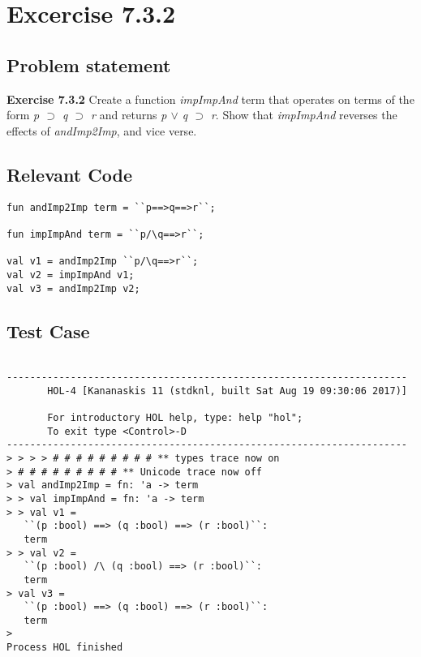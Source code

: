 \documentclass{report}
\begin{document}
\chapter{Excercise 7.3.2}
\label{cha:7.3.2}


\section{Problem statement}
\label{problem-statement-7-3-2}
\textbf{Exercise 7.3.2} Create a function \emph{impImpAnd} term that operates on terms of the form \emph{p $\supset$ q $\supset$ r} and returns \emph{p $\lor$ q $\supset$ r}. Show that \emph{impImpAnd} reverses the effects of \emph{andImp2Imp}, and vice verse.

\section{Relevant Code}
\label{rel-code-7-3-2}
\begin{lstlisting}[frame=TBlr]
fun andImp2Imp term = ``p==>q==>r``;

fun impImpAnd term = ``p/\q==>r``;

val v1 = andImp2Imp ``p/\q==>r``;
val v2 = impImpAnd v1;
val v3 = andImp2Imp v2;

\end{lstlisting}

\section{Test Case}
\label{test-results-7-3-2}
\begin{session}
  \begin{scriptsize}
\begin{verbatim}

---------------------------------------------------------------------
       HOL-4 [Kananaskis 11 (stdknl, built Sat Aug 19 09:30:06 2017)]

       For introductory HOL help, type: help "hol";
       To exit type <Control>-D
---------------------------------------------------------------------
> > > > # # # # # # # # # ** types trace now on
> # # # # # # # # # ** Unicode trace now off
> val andImp2Imp = fn: 'a -> term
> > val impImpAnd = fn: 'a -> term
> > val v1 =
   ``(p :bool) ==> (q :bool) ==> (r :bool)``:
   term
> > val v2 =
   ``(p :bool) /\ (q :bool) ==> (r :bool)``:
   term
> val v3 =
   ``(p :bool) ==> (q :bool) ==> (r :bool)``:
   term
> 
Process HOL finished


\end{verbatim}
  \end{scriptsize}
\end{session}
\end{document}
